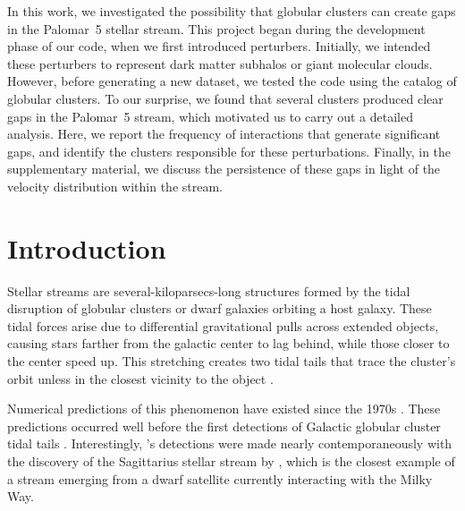 \normalsize
{}

In this work, we investigated the possibility that globular clusters can create gaps in the Palomar~5 stellar stream. This project began during the development phase of our code, when we first introduced perturbers. Initially, we intended these perturbers to represent dark matter subhalos or giant molecular clouds. However, before generating a new dataset, we tested the code using the catalog of globular clusters. To our surprise, we found that several clusters produced clear gaps in the Palomar~5 stream, which motivated us to carry out a detailed analysis. Here, we report the frequency of interactions that generate significant gaps, and identify the clusters responsible for these perturbations. Finally, in the supplementary material, we discuss the persistence of these gaps in light of the velocity distribution within the stream.

\section{Introduction}
    Stellar streams are several-kiloparsecs-long structures formed by the tidal disruption of globular clusters or dwarf galaxies orbiting a host galaxy. These tidal forces arise due to differential gravitational pulls across extended objects, causing stars farther from the galactic center to lag behind, while those closer to the center speed up. This stretching creates two tidal tails that trace the cluster's orbit unless in the closest vicinity to the object \citep{2007ApJ...659.1212M}. 

    Numerical predictions of this phenomenon have existed since the 1970s \citep[see, e.g.,][]{1975AJ.....80..290K}. These predictions occurred well before the first detections of Galactic globular cluster tidal tails \citep{1995AJ....109.2553G}. Interestingly, \citet{1995AJ....109.2553G}'s detections were made nearly contemporaneously with the discovery of the Sagittarius stellar stream by \citet{1994Natur.370..194I}, which is the closest example of a stream emerging from a dwarf satellite currently interacting with the Milky Way. 

